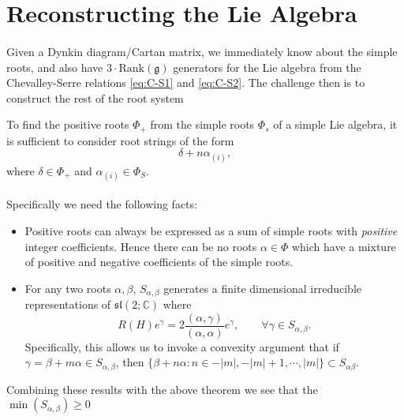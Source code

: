 \documentclass[11pt,fleqn]{article}
\begin{document}
\section{Reconstructing the Lie Algebra}

\paragraph{} Given a Dynkin diagram/Cartan matrix, we immediately know about the simple roots, and also have $3 \cdot \text{Rank}(\mathfrak{g})$ generators for the Lie algebra from the Chevalley-Serre relations \eqref{eq:C-S1} and \eqref{eq:C-S2}. The challenge then is to construct the rest of the root system

\begin{theorem}
	To find the positive roots $\Phi_+$ from the simple roots $\Phi_s$ of a simple Lie algebra, it is sufficient to consider root strings of the form
		\begin{equation*}
			\delta + n \alpha_{(i)},
		\end{equation*}
	where $\delta \in \Phi_+$ and $\alpha_{(i)} \in \Phi_S$.
\end{theorem}

\paragraph{} Specifically we need the following facts:
	\begin{itemize}
		\item Positive roots can always be expressed as a sum of simple roots with \textit{positive} integer coefficients. Hence there can be no roots $ \alpha \in \Phi $ which have a mixture of positive and negative coefficients of the simple roots.
		\item For any two roots $ \alpha, \beta $, $ S_{\alpha,\beta} $ generates a finite dimensional irreducible representations of $ \mathfrak{sl}(2;\mathbb{C}) $ where
			\begin{equation}\label{key}
				R(H)e^\gamma = 2\frac{(\alpha,\gamma)}{(\alpha, \alpha)} e^\gamma,
				\qquad \forall \gamma \in S_{\alpha,\beta}.
			\end{equation} 
		Specifically, this allows us to invoke a convexity argument that if $ \gamma = \beta + m \alpha \in S_{\alpha,\beta} $, then $ \{ \beta + n \alpha : n \in {-|m|, -|m| + 1, \cdots, |m|} \} \subset  S_{\alpha\beta} $.
	\end{itemize}
Combining these results with the above theorem we see that the $ \min(S_{\alpha,\beta}) \geq 0 $
\end{document}
